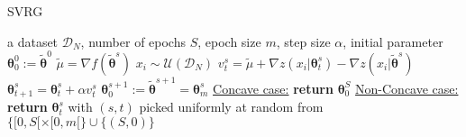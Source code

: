 \documentclass{article}
\theoremstyle{remark}
\theoremstyle{definition}
\newcommand{\vtheta}{\boldsymbol{\theta}}
\newcommand{\wt}[1]{\widetilde{#1}}
\begin{document}
\begin{algorithm}[tb]
	\caption{SVRG}
	\label{alg:svrg}
	\begin{algorithmic}
             a dataset $\mathcal{D}_N$, number of epochs $S$, epoch size $m$, step size $\alpha$, initial parameter $\vtheta_{0}^0:=\wt{\vtheta}^0$
        \STATE $\wt{\mu} = \nabla f(\wt{\vtheta}^s)$
        \STATE $x_i \sim \mathcal{U}\left(\mathcal{D}_N\right)$
		\STATE $v^{s}_t = 
			\wt{\mu} + 
			\nabla z(x_i|\vtheta_t^{s}) -
			\nabla z(x_i|\wt{\vtheta}^{s})
		$
        \STATE $\vtheta_{t+1}^{s} = \vtheta_t^{s} + \alpha v^{s}_t$
		\ENDFOR
        \STATE $\vtheta_0^{s+1} := \wt{\vtheta}^{s+1} = \vtheta_{m}^s$
		\ENDFOR
        \STATE \underline{Concave case:} \textbf{return} $\vtheta_{0}^S$
        \STATE \underline{Non-Concave case:} \textbf{return} $\vtheta_t^s$ with $(s,t)$ picked uniformly at random from $\{[0,S[\times[0,m[\} \cup \{(S,0)\}$
	\end{algorithmic}
\end{algorithm}
\end{document}
